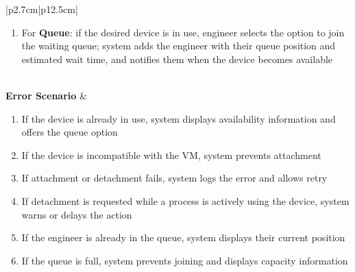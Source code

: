 \begin{table}[H]
\begin{tabular}{|p{2.7cm}|p{12.5cm}|}
\begin{minipage}[t]{\linewidth}
\begin{enumerate}[topsep=0pt,itemsep=1pt,parsep=0pt,partopsep=0pt]
                                                    detachment; system disconnects the device, releases it for use by other
                                                    sessions, and confirms the action
                                              \item For \textbf{Queue}: if the desired device is in use, engineer selects the
                                                    option to join the waiting queue; system adds the engineer with their queue
                                                    position and estimated wait time, and notifies them when the device becomes
                                                    available
                                          \end{enumerate}
                                      \end{minipage}                                                      \\
            \hline
            \textbf{Error Scenario} & \begin{minipage}[t]{\linewidth}
                                          \begin{enumerate}[topsep=0pt,itemsep=1pt,parsep=0pt,partopsep=0pt]
                                              \item If the device is already in use, system displays availability information and
                                                    offers the queue option
                                              \item If the device is incompatible with the VM, system prevents attachment
                                              \item If attachment or detachment fails, system logs the error and allows retry
                                              \item If detachment is requested while a process is actively using the device, system
                                                    warns or delays the action
                                              \item If the engineer is already in the queue, system displays their current position
                                              \item If the queue is full, system prevents joining and displays capacity information
                                          \end{enumerate}
                                      \end{minipage}                                                     \\
            \hline
        \end{tabular}
        \label{tab:eng-manage-devices}
    \end{table}
